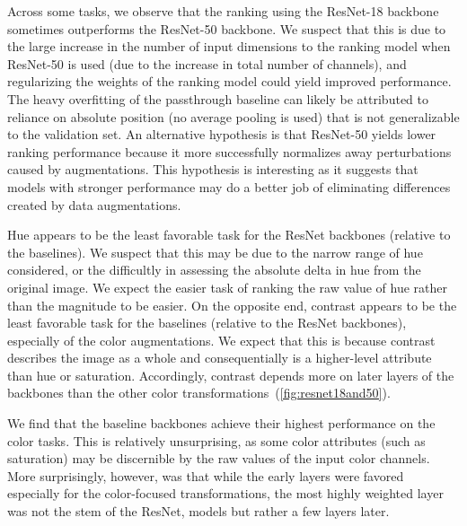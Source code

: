 Across some tasks, we observe that the ranking using the ResNet-18 backbone sometimes outperforms the ResNet-50 backbone.
We suspect that this is due to the large increase in the number of input dimensions to the ranking model when ResNet-50 is used (due to the increase in total number of channels), and regularizing the weights of the ranking model could yield improved performance.
The heavy overfitting of the passthrough baseline can likely be attributed to reliance on absolute position (no average pooling is used) that is not generalizable to the validation set.
An alternative hypothesis is that ResNet-50 yields lower ranking performance because it more successfully normalizes away perturbations caused by augmentations.
This hypothesis is interesting as it suggests that models with stronger performance may do a better job of eliminating differences created by data augmentations.

Hue appears to be the least favorable task for the ResNet backbones (relative to the baselines).
We suspect that this may be due to the narrow range of hue considered, or the difficultly in assessing the absolute delta in hue from the original image.
We expect the easier task of ranking the raw value of hue rather than the magnitude to be easier.
On the opposite end, contrast appears to be the least favorable task for the baselines (relative to the ResNet backbones), especially of the color augmentations.
We expect that this is because contrast describes the image as a whole and consequentially is a higher-level attribute than hue or saturation.
Accordingly, contrast depends more on later layers of the backbones than the other color transformations~(\autoref{fig:resnet18and50}).


We find that the baseline backbones achieve their highest performance on the color tasks.
This is relatively unsurprising, as some color attributes (such as saturation) may be discernible by the raw values of the input color channels.
More surprisingly, however, was that while the early layers were favored especially for the color-focused transformations, the most highly weighted layer was not the stem of the ResNet, models but rather a few layers later.


